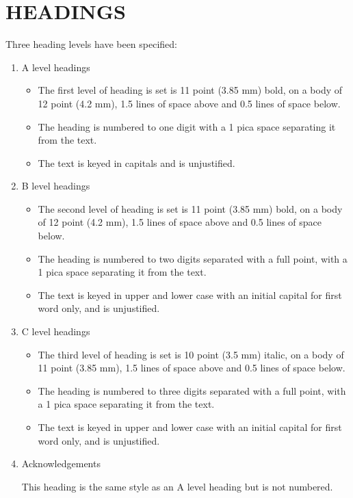 \documentclass{ecai2012}
\begin{document}
\section{HEADINGS}\label{heads}
Three heading levels have been specified:

\begin{enumerate}
\item{A level headings}

\begin{itemize}
\item The first level of heading is set is 11 point (3.85 mm) bold, on
  a body of 12 point (4.2 mm), 1.5 lines of space above and 0.5 lines
  of space below.

\item The heading is numbered to one digit with a 1 pica space
  separating it from the text.

\item The text is keyed in capitals and is unjustified.
\end{itemize}

\item{B level headings}
\begin{itemize}
\item The second level of heading is set is 11 point (3.85 mm) bold,
  on a body of 12 point (4.2 mm), 1.5 lines of space above and 0.5
  lines of space below.

\item The heading is numbered to two digits separated with a full
  point, with a 1 pica space separating it from the text.

\item The text is keyed in upper and lower case with an initial
  capital for first word only, and is unjustified.
\end{itemize}

\item{C level headings}
\begin{itemize}
\item The third level of heading is set is 10 point (3.5 mm) italic,
  on a body of 11 point (3.85 mm), 1.5 lines of space above and 0.5
  lines of space below.

\item The heading is numbered to three digits separated with a full
  point, with a 1 pica space separating it from the text.

\item The text is keyed in upper and lower case with an initial
  capital for first word only, and is unjustified.
\end{itemize}

\item{Acknowledgements}

  This heading is the same style as an A level heading but is not
  numbered.
\end{enumerate}
\end{document}
